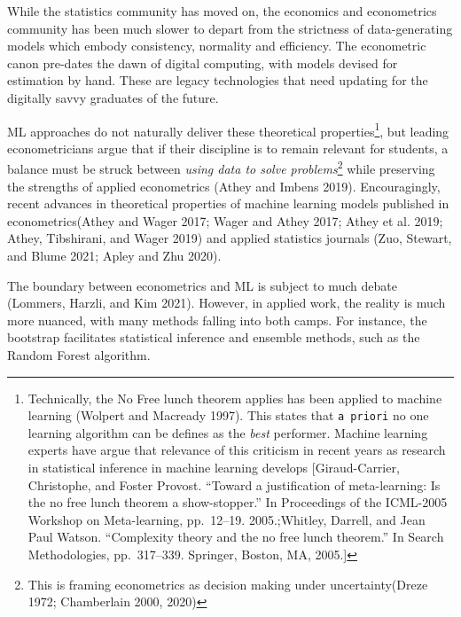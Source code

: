 \documentclass{article}
\begin{document}
While the statistics community has moved on, the economics and
econometrics community has been much slower to depart from the
strictness of data-generating models which embody consistency, normality
and efficiency. The econometric canon pre-dates the dawn of digital
computing, with models devised for estimation by hand. These are legacy
technologies that need updating for the digitally savvy graduates of the
future.

ML approaches do not naturally deliver these theoretical
properties\footnote{Technically, the No Free lunch theorem applies has
  been applied to machine learning (Wolpert and Macready 1997). This
  states that \texttt{a\ priori} no one learning algorithm can be
  defines as the \emph{best} performer. Machine learning experts have
  argue that relevance of this criticism in recent years as research in
  statistical inference in machine learning develops {[}Giraud-Carrier,
  Christophe, and Foster Provost. ``Toward a justification of
  meta-learning: Is the no free lunch theorem a show-stopper.'' In
  Proceedings of the ICML-2005 Workshop on Meta-learning, pp.~12--19.
  2005.;Whitley, Darrell, and Jean Paul Watson. ``Complexity theory and
  the no free lunch theorem.'' In Search Methodologies, pp.~317--339.
  Springer, Boston, MA, 2005.{]}}, but leading econometricians argue
that if their discipline is to remain relevant for students, a balance
must be struck between \emph{using data to solve problems}\footnote{This
  is framing econometrics as decision making under uncertainty(Dreze
  1972; Chamberlain 2000, 2020)} while preserving the strengths of
applied econometrics (Athey and Imbens 2019). Encouragingly, recent
advances in theoretical properties of machine learning models published
in econometrics(Athey and Wager 2017; Wager and Athey 2017; Athey et al.
2019; Athey, Tibshirani, and Wager 2019) and applied statistics journals
(Zuo, Stewart, and Blume 2021; Apley and Zhu 2020).

The boundary between econometrics and ML is subject to much debate
(Lommers, Harzli, and Kim 2021). However, in applied work, the reality
is much more nuanced, with many methods falling into both camps. For
instance, the bootstrap facilitates statistical inference and ensemble
methods, such as the Random Forest algorithm.
\end{document}
